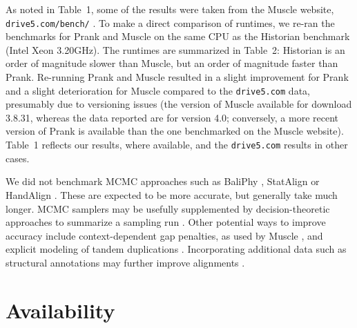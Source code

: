 As noted in Table~1, some of the results were taken from the Muscle website, {\tt drive5.com/bench/} \citep{Edgar2010}.
To make a direct comparison of runtimes, we re-ran the benchmarks for Prank and Muscle on the same CPU as the Historian benchmark (Intel Xeon 3.20GHz).
The runtimes are summarized in Table~2: Historian is an order of magnitude slower than Muscle, but an order of magnitude faster than Prank.
Re-running Prank and Muscle resulted in a slight improvement for Prank
and a slight deterioration for Muscle compared to the {\tt drive5.com} data,
presumably due to versioning issues
(the version of Muscle available for download 3.8.31, whereas the data
reported are for version 4.0; conversely, a more recent version of Prank is available
than the one benchmarked on the Muscle website).
Table~1 reflects our results, where available, and the {\tt drive5.com} results in other cases.

We did not benchmark MCMC approaches
such as BaliPhy \citep{Redelings2014}, StatAlign \citep{NovakEtAl2008} or HandAlign \citep{WestessonBarquistHolmes2012}.
These are expected to be more accurate, but generally take much longer.
MCMC samplers may be usefully supplemented by decision-theoretic approaches to summarize a sampling run \citep{HermanEtAl2015}.
Other potential ways to improve accuracy include context-dependent gap penalties, as used by Muscle \citep{Edgar2004b}, %
and explicit modeling of tandem duplications \citep{SzalkowskiAnisimova2013}.
Incorporating additional data such as structural annotations may further improve alignments \citep{HermanEtAl2014}.

% 
% 
% 



\section{Availability}


